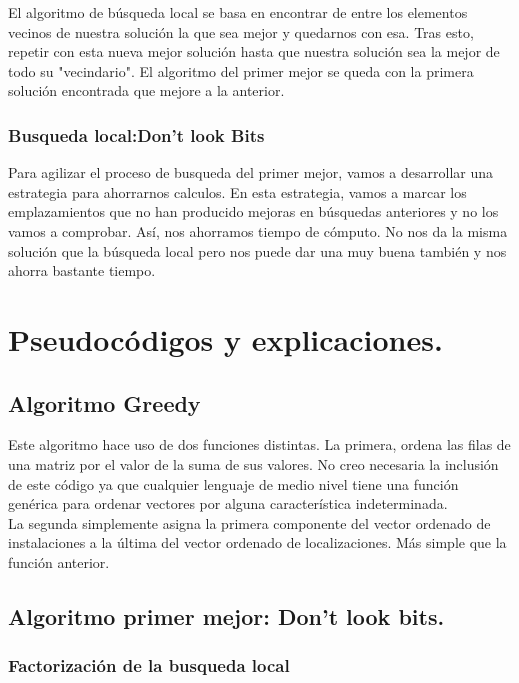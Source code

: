 El algoritmo de búsqueda local se basa en encontrar de entre los elementos vecinos de nuestra solución la que sea mejor y quedarnos con esa. Tras esto, repetir con esta nueva mejor solución hasta que nuestra solución sea la mejor de todo su "vecindario". El algoritmo del primer mejor se queda con la primera solución encontrada que mejore a la anterior.

\subsubsection{Busqueda local:Don't look Bits}
Para agilizar el proceso de busqueda del primer mejor, vamos a desarrollar una estrategia para ahorrarnos calculos. En esta estrategia, vamos a marcar los emplazamientos que no han producido mejoras en búsquedas anteriores y no los vamos a comprobar. Así, nos ahorramos tiempo de cómputo. No nos da la misma solución que la búsqueda local pero nos puede dar una muy buena también y nos ahorra bastante tiempo.

\newpage
\section{Pseudocódigos y explicaciones.}

\subsection{Algoritmo Greedy}
Este algoritmo hace uso de dos funciones distintas. La primera, ordena las filas de una matriz por el valor de la suma de sus valores. No creo necesaria la inclusión de este código ya que cualquier lenguaje de medio nivel tiene una función genérica para ordenar vectores por alguna característica indeterminada. \\
La segunda simplemente asigna la primera componente del vector ordenado de instalaciones a la última del vector ordenado de localizaciones. Más simple que la función anterior.





\subsection{Algoritmo primer mejor: Don't look bits.}

\subsubsection{Factorización de la busqueda local}

